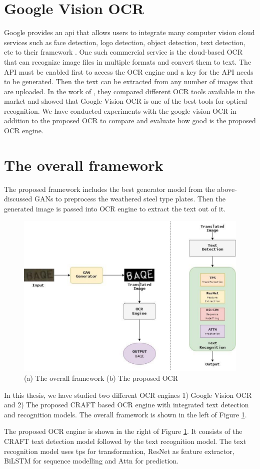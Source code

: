 \section{Google Vision OCR}
Google provides an \gls{api} that allows users to integrate many computer vision cloud services such as face detection, logo detection, object detection, text detection, etc to their framework \citep{googleapi}. One such commercial service is the cloud-based OCR that can recognize image files in multiple formats and convert them to text. The API must be enabled first to access the OCR engine and a key for the API needs to be generated. Then the text can be extracted from any number of images that are uploaded. In the work of \citep{compocrs}, they compared different OCR tools available in the market and showed that Google Vision OCR is one of the best tools for optical recognition. We have conducted experiments with the google vision OCR in addition to the proposed OCR to compare and evaluate how good is the proposed OCR engine.


\section{The overall framework}

The proposed framework includes the best generator model from the above-discussed GANs to preprocess the weathered steel type plates. Then the
generated image is passed into OCR engine to extract the text out of it.
\begin{figure}[H]
\centering
\includegraphics[width=5in]{images/overall.eps}
\caption{(a) The overall framework     (b) The proposed OCR }
\label{fig:framework}
\end{figure}
	
	In this thesis, we have studied two different OCR engines 1) Google Vision OCR and 2) The proposed CRAFT based OCR engine with integrated text detection and recognition models. The overall framework is shown in the left of Figure \ref{fig:framework}. 
\newline

	 The proposed OCR engine is shown in the right of Figure
\ref{fig:framework}. It consists of the CRAFT text detection model followed by the text recognition model. The text recognition model uses \gls{tps} for transformation, ResNet as feature extractor, BiLSTM for sequence modelling and Attn for prediction. 


	